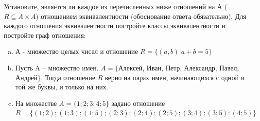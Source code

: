 \question
Установите, является ли каждое из перечисленных ниже отношений на А ($R \subseteq A \times A$) отношением эквивалентности (обоснование ответа обязательно). Для каждого отношения эквивалентности постройте классы 
эквивалентности и постройте граф отношения:
\begin{enumerate} [a)]\setcounter{enumi}{0}
\item А - множество целых чисел и отношение $R = \{(a,b)|a + b = 5\}$
\item Пусть A – множество имен. $A = \{ $Алексей, Иван, Петр, Александр, Павел, Андрей$ \}$. Тогда отношение $R $ верно на парах имен, начинающихся с одной и той же буквы, и только на них.
\item На множестве $A = \{1; 2; 3; 4; 5\}$ задано отношение $R = \{(1; 2); (1; 3); (1; 5); (2; 3); (2; 4); (2; 5); (3; 4); (3; 5); (4; 5)\}$
\end{enumerate}